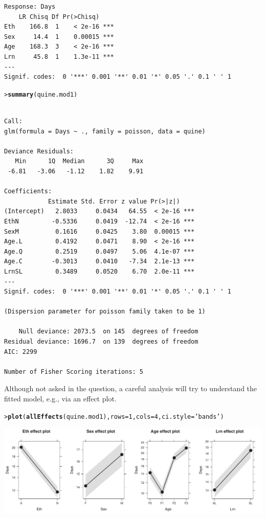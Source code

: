 \documentclass[10pt]{report}\usepackage[]{graphicx}\usepackage[]{color}
\makeatletter
\newcommand{\hlnum}[1]{\textcolor[rgb]{0.686,0.059,0.569}{#1}}%
\newcommand{\hlstr}[1]{\textcolor[rgb]{0.192,0.494,0.8}{#1}}%
\newcommand{\hlstd}[1]{\textcolor[rgb]{0.345,0.345,0.345}{#1}}%
\newcommand{\hlkwc}[1]{\textcolor[rgb]{0.333,0.667,0.333}{#1}}%
\newcommand{\hlkwd}[1]{\textcolor[rgb]{0.737,0.353,0.396}{\textbf{#1}}}%
\newenvironment{kframe}{%
 \def\at@end@of@kframe{}%
 \ifinner\ifhmode%
  \def\at@end@of@kframe{\end{minipage}}%
  \begin{minipage}{\columnwidth}%
 \fi\fi%
 \def\FrameCommand##1{\hskip\@totalleftmargin \hskip-\fboxsep
 \colorbox{shadecolor}{##1}\hskip-\fboxsep
     \hskip-\linewidth \hskip-\@totalleftmargin \hskip\columnwidth}%
 \MakeFramed {\advance\hsize-\width
   \@totalleftmargin\z@ \linewidth\hsize
   \@setminipage}}%
 {\par\unskip\endMakeFramed%
 \at@end@of@kframe}
\newenvironment{knitrout}{}{} %
\renewenvironment{knitrout}{\small\renewcommand{\baselinestretch}{.85}}{} %
\makeatother
\begin{document}
\begin{Exercises}
\begin{enumerate*}
\begin{ans}
\begin{knitrout}
\begin{kframe}
\begin{verbatim}
Response: Days
    LR Chisq Df Pr(>Chisq)    
Eth    166.8  1    < 2e-16 ***
Sex     14.4  1    0.00015 ***
Age    168.3  3    < 2e-16 ***
Lrn     45.8  1    1.3e-11 ***
---
Signif. codes:  0 '***' 0.001 '**' 0.01 '*' 0.05 '.' 0.1 ' ' 1
\end{verbatim}
\begin{alltt}
\hlstd{> }\hlkwd{summary}\hlstd{(quine.mod1)}
\end{alltt}
\begin{verbatim}

Call:
glm(formula = Days ~ ., family = poisson, data = quine)

Deviance Residuals: 
   Min      1Q  Median      3Q     Max  
 -6.81   -3.06   -1.12    1.82    9.91  

Coefficients:
            Estimate Std. Error z value Pr(>|z|)    
(Intercept)   2.8033     0.0434   64.55  < 2e-16 ***
EthN         -0.5336     0.0419  -12.74  < 2e-16 ***
SexM          0.1616     0.0425    3.80  0.00015 ***
Age.L         0.4192     0.0471    8.90  < 2e-16 ***
Age.Q         0.2519     0.0497    5.06  4.1e-07 ***
Age.C        -0.3013     0.0410   -7.34  2.1e-13 ***
LrnSL         0.3489     0.0520    6.70  2.0e-11 ***
---
Signif. codes:  0 '***' 0.001 '**' 0.01 '*' 0.05 '.' 0.1 ' ' 1

(Dispersion parameter for poisson family taken to be 1)

    Null deviance: 2073.5  on 145  degrees of freedom
Residual deviance: 1696.7  on 139  degrees of freedom
AIC: 2299

Number of Fisher Scoring iterations: 5
\end{verbatim}
\end{kframe}
\end{knitrout}
    Although not asked in the question, a careful analysis will try to understand the fitted model,
    e.g., via an effect plot.
\begin{knitrout}\footnotesize
{}\color{fgcolor}\begin{kframe}
\begin{alltt}
\hlstd{> }\hlkwd{plot}\hlstd{(}\hlkwd{allEffects}\hlstd{(quine.mod1),} \hlkwc{rows}\hlstd{=}\hlnum{1}\hlstd{,} \hlkwc{cols}\hlstd{=}\hlnum{4}\hlstd{,} \hlkwc{ci.style}\hlstd{=}\hlstr{'bands'}\hlstd{)}
\end{alltt}
\end{kframe}

\centerline{\includegraphics[width=.9\textwidth]{soln/fig/ex11_2a2-1} }




\end{knitrout}
\end{ans}
\end{enumerate*}
\end{Exercises}
\end{document}

